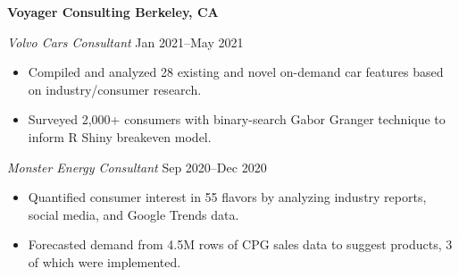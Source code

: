\textbf{Voyager Consulting \hfill Berkeley, CA}\par

\textit{Volvo Cars Consultant} \hfill Jan 2021--May 2021
\begin{itemize}
	\item Compiled and analyzed 28 existing and novel on-demand car features based on industry/consumer research.
	\item Surveyed 2,000+ consumers with binary-search Gabor Granger technique to inform R Shiny breakeven model.
\end{itemize}\par

\textit{Monster Energy Consultant} \hfill Sep 2020--Dec 2020
\begin{itemize}
	\item Quantified consumer interest in 55 flavors by analyzing industry reports, social media, and Google Trends data.
	\item Forecasted demand from 4.5M rows of CPG sales data to suggest products, 3 of which were implemented.
\end{itemize}\par